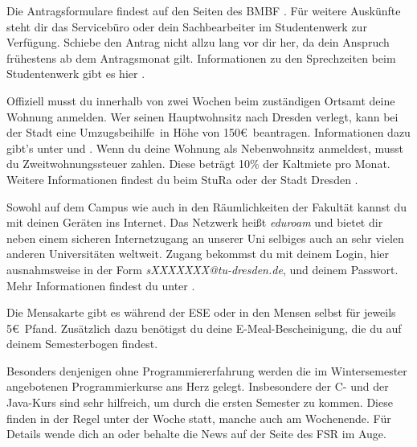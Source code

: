 \begin{itemize}[leftmargin=*]
Die Antragsformulare findest auf den Seiten des BMBF . Für weitere Auskünfte steht dir das Servicebüro oder dein Sachbearbeiter im Studentenwerk zur Verfügung.
Schiebe den Antrag nicht allzu lang vor dir her, da dein Anspruch frühestens ab dem Antragsmonat gilt.
Informationen zu den Sprechzeiten beim Studentenwerk gibt es hier .

\newpage

Offiziell musst du innerhalb von zwei Wochen beim zuständigen Ortsamt  deine Wohnung anmelden.
Wer seinen Hauptwohnsitz nach Dresden verlegt, kann bei der Stadt eine \glqq Umzugsbeihilfe\grqq\ in Höhe von 150\euro\ beantragen.
Informationen dazu gibt's unter  und .
Wenn du deine Wohnung als Nebenwohnsitz anmeldest, musst du Zweitwohnungssteuer zahlen. Diese beträgt 10\% der Kaltmiete pro Monat. Weitere Informationen findest du beim StuRa  oder der Stadt Dresden .

Sowohl auf dem Campus wie auch in den Räumlichkeiten der Fakultät kannst du mit deinen Geräten ins Internet.
Das Netzwerk heißt \textit{eduroam} und bietet dir neben einem sicheren Internetzugang an unserer Uni selbiges auch an sehr vielen anderen Universitäten weltweit.
Zugang bekommst du mit deinem Login, hier ausnahmsweise in der Form \textit{sXXXXXXX@tu-dresden.de}, und deinem Passwort. Mehr Informationen findest du unter .

Die Mensakarte gibt es während der ESE oder in den Mensen selbst für jeweils 5\euro\ Pfand.
Zusätzlich dazu benötigst du deine E-Meal-Bescheinigung, die du auf deinem Semesterbogen findest.

Besonders denjenigen ohne Programmiererfahrung werden die im Wintersemester angebotenen Programmierkurse ans Herz gelegt. Insbesondere der C- und der Java-Kurs sind sehr hilfreich, um durch die ersten Semester zu kommen. 
Diese finden in der Regel unter der Woche statt, manche auch am Wochenende.
Für Details wende dich an  oder behalte die News auf der Seite des FSR  im Auge.


\end{itemize}
